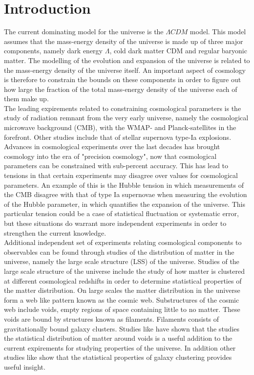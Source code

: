 \chapter{Introduction}
The current dominating model for the universe is the $\Lambda CDM$ model. This model assumes that the mass-energy density of the universe is made up of three major components, namely dark energy $\Lambda$, cold dark matter CDM and regular baryonic matter. The modelling of the evolution and expansion of the universe is related to the mass-energy density of the universe itself. An important aspect of cosmology is therefore to constrain the bounds on these components in order to figure out how large the fraction of the total mass-energy density of the universe each of them make up.\\\indent
The leading expirements related to constraining cosmological parameters is the study of radiation remnant from the very early universe, namely the cosmological microwave background (CMB)\cite{1965cmb}, with the WMAP\cite{Wmap}- and Planck-satellites\cite{planckvi} in the forefront. Other studies include that of stellar supernova type-Ia explosions\cite{Pantheon}. Advances in cosmological experiments over the last decades has brought cosmology into the era of "precision cosmology", now that cosmological parameters can be constrained with sub-percent accuracy. This has lead to tensions in that certain experiments may disagree over values for cosmological parameters. An example of this is the Hubble tension in which measurements of the CMB disagree with that of type Ia supernovae when measuring the evolution of the Hubble parameter, in which quantifies the expansion of the universe. This particular tension could be a case of statistical fluctuation or systematic error, but these situations do warrant more independent experiments in order to strengthen the current knowledge.\\\indent Additional independent set of experiments relating cosmological components to observables can be found through studies of the distribution of matter in the universe, namely the large scale structure (LSS) of the universe. Studies of the large scale structure of the universe include the study of how matter is clustered at different cosmological redshifts in order to determine statistical properties of the matter distribution. On large scales the matter distribution in the universe form a web like pattern known as the cosmic web\cite{bondweb}. Substructures of the cosmic web include voids, empty regions of space containing little to no matter. These voids are bound by structures known as filaments. Filaments consists of gravitationally bound galaxy clusters. Studies like \cite{BeyondBAO}\cite{Nadathur_2020} have shown that the studies the statistical distribution of matter around voids is a useful addition to the current expirements for studying properties of the universe. In addition other studies like \cite{refId0} show that the statistical properties of galaxy clustering provides useful insight. \\\indent
